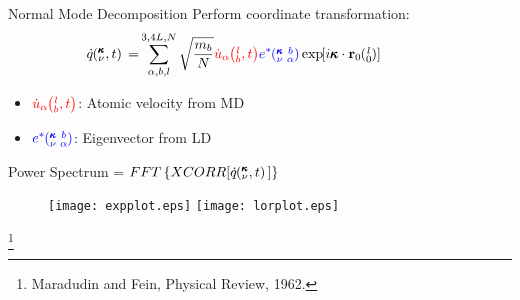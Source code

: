 \documentclass{beamer}
\newcommand{\EXP}[1]{\exp\mspace{-5.0mu}\left[#1\right]\mspace{-3.0mu}}
\newcommand{\lO}{\mspace{-4.0mu}\left(\mspace{-8.0mu}
\begin{smallmatrix}&l \\&0\end{smallmatrix}
\mspace{-3.0mu}\right)}
\newcommand{\kvba}{\mspace{-4.0mu}\left(\mspace{-8.0mu}
\begin{smallmatrix} &\pmb{\kappa} &b \\ &\nu &\alpha\end{smallmatrix}
\mspace{-3.0mu}\right)}
\newcommand{\kvt}{\mspace{-4.0mu}\left(\mspace{-8.0mu}
\begin{smallmatrix}&\pmb{\kappa} \\&\nu\end{smallmatrix}
\mspace{-2.0mu},t\right)}
\newcommand{\kvw}{\mspace{-4.0mu}\left(\mspace{-8.0mu}
\begin{smallmatrix}&\pmb{\kappa} \\&\nu\end{smallmatrix}
\mspace{-2.0mu},\omega\right)}
\newcommand{\kv}{\mspace{-4.0mu}\left(\mspace{-8.0mu}
\begin{smallmatrix}&\pmb{\kappa} \\&\nu\end{smallmatrix}
\mspace{-3.0mu}\right)}
\newcommand{\lbt}{\mspace{-4.0mu}\left(\mspace{-8.0mu}
\begin{smallmatrix}&l \\&b\end{smallmatrix}\mspace{-2.0mu},t\right)}
\begin{document}
\begin{frame}{Normal Mode Decomposition}
Perform coordinate transformation:
\begin{equation*}\label{EQ:NMD:qdot}
\begin{split}
\hspace*{-1cm}\dot{q}\kvt{}{}{}=&\sum_{\alpha, b, l}^{3,4L,N}\sqrt{\frac{m_b}{N}}\textcolor{red}{\dot{u}_{\alpha}\lbt}\textcolor{blue}{e^*\kvba}\EXP{i\pmb{\kappa}\cdot\mathbf{r}_0\lO}
\end{split}
\end{equation*}
\hspace*{-2cm}
\vspace*{-0.5cm}
\begin{itemize}
\item $\textcolor{red}{\dot{u}_{\alpha}\lbt}$: Atomic velocity from MD
\item $\textcolor{blue}{e^*\kvba}$: Eigenvector from LD
\end{itemize}
Power Spectrum = $FFT\left \{XCORR[\dot{q}\kvt{}{}{}] \right\} $
\begin{figure}%
\begin{center}
\texttt{[image: expplot.eps]} \hspace{0.05\textwidth}%
\texttt{[image: lorplot.eps]} \\[2em]
\end{center}
\end{figure}
\vspace*{-1cm}
\footnote{Maradudin and Fein, Physical Review, 1962.}
\end{frame}
\end{document}
